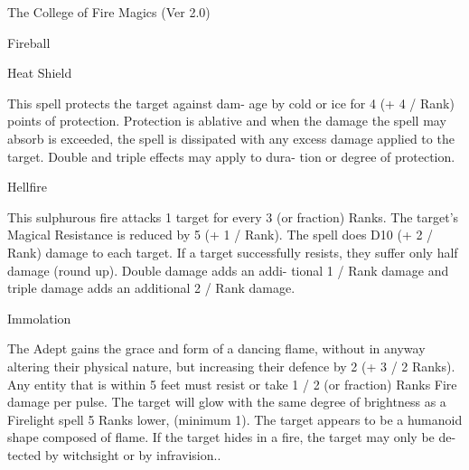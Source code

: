 \begin{Chapter}{The College of Fire Magics (Ver 2.0)}
\begin{spell}[S-4]{Fireball }
\begin{effects}
\end{effects}
\end{spell}

\begin{spell}[S-5]{Heat Shield }

\begin{effects}
 This  spell  protects  the  target  against dam-
age  by  cold  or  ice  for  4  (+  4  /  Rank)  points  of 
protection.  Protection  is  ablative  and  when  the 
damage the spell may absorb is exceeded, the spell 
is dissipated with any excess damage applied to the 
target. Double and triple effects may apply to dura-
tion or degree of protection. 

\end{effects}
\end{spell}

\begin{spell}[S-6]{Hellfire }

\begin{effects}
 This  sulphurous  fire  attacks  1  target  for 
every  3  (or  fraction)  Ranks.  The  target’s  Magical 
Resistance is reduced by 5 (+ 1 / Rank). The spell 
does D10 (+ 2 / Rank) damage to each target.  If a 
target  successfully  resists,  they  suffer  only  half 
damage  (round  up).  Double  damage  adds  an  addi-
tional 1 / Rank damage and triple damage adds an 
additional 2 / Rank damage. 

\end{effects}
\end{spell}

\begin{spell}[S-7]{Immolation }

\begin{effects}
 The  Adept  gains  the  grace  and  form  of  a 
dancing  flame,  without  in  anyway  altering  their 
physical  nature,  but  increasing  their  defence  by  2 
(+  3  /  2  Ranks).  Any  entity  that  is  within  5  feet 
must  resist  or  take  1  /  2  (or  fraction)  Ranks  Fire 
damage  per  pulse.  The  target  will  glow  with  the 
same  degree  of  brightness  as  a  Firelight  spell  5 
Ranks  lower,  (minimum  1).  The  target  appears  to 
be  a  humanoid  shape  composed  of  flame.  If  the 
target  hides  in  a  fire,  the  target  may  only  be  de-
tected by witchsight or by infravision.. 


\end{effects}
\end{spell}
\end{Chapter}

